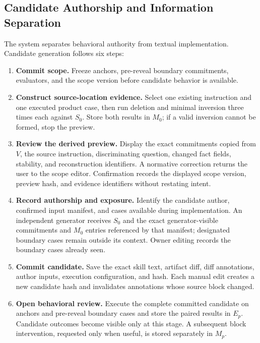 \subsection{Candidate Authorship and Information Separation}
\label{app:patch-generation}

The system separates behavioral authority from textual implementation. Candidate generation follows six steps:

\begin{enumerate}[leftmargin=*]
    \item \textbf{Commit scope.} Freeze anchors, pre-reveal boundary commitments, evaluators, and the scope version before candidate behavior is available.
    \item \textbf{Construct source-location evidence.} Select one existing instruction and one executed product case, then run deletion and minimal inversion three times each against $S_0$. Store both results in $M_0$; if a valid inversion cannot be formed, stop the preview.
    \item \textbf{Review the derived preview.} Display the exact commitments copied from $V$, the source instruction, discriminating question, changed fact fields, stability, and reconstruction identifiers. A normative correction returns the user to the scope editor. Confirmation records the displayed scope version, preview hash, and evidence identifiers without restating intent.
    \item \textbf{Record authorship and exposure.} Identify the candidate author, confirmed input manifest, and cases available during implementation. An independent generator receives $S_0$ and the exact generator-visible commitments and $M_0$ entries referenced by that manifest; designated boundary cases remain outside its context. Owner editing records the boundary cases already seen.
    \item \textbf{Commit candidate.} Save the exact skill text, artifact diff, diff annotations, author inputs, execution configuration, and hash. Each manual edit creates a new candidate hash and invalidates annotations whose source block changed.
    \item \textbf{Open behavioral review.} Execute the complete committed candidate on anchors and pre-reveal boundary cases and store the paired results in $E_p$. Candidate outcomes become visible only at this stage. A subsequent block intervention, requested only when useful, is stored separately in $M_p$.
\end{enumerate}

